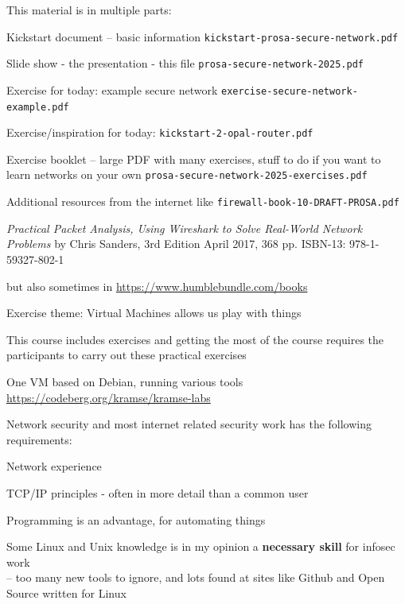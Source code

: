 \documentclass[Screen16to9,17pt]{foils}
\begin{document}
\begin{list2}
\item This material is in multiple parts:
\item Kickstart document -- basic information
\verb+kickstart-prosa-secure-network.pdf+
\item Slide show - the presentation - this file
\verb+prosa-secure-network-2025.pdf+
\item Exercise for today: example secure network \verb+exercise-secure-network-example.pdf+
\item Exercise/inspiration for today: \verb+kickstart-2-opal-router.pdf+
\item Exercise booklet -- large PDF with many exercises, stuff to do if you want to learn networks on your own
\verb+prosa-secure-network-2025-exercises.pdf+
\item Additional resources from the internet like \verb+firewall-book-10-DRAFT-PROSA.pdf+

\end{list2}



\emph{Practical Packet Analysis,
Using Wireshark to Solve Real-World Network Problems}
by Chris Sanders, 3rd Edition
April 2017, 368 pp.
ISBN-13:
978-1-59327-802-1

 but also sometimes in \url{https://www.humblebundle.com/books}



Exercise theme: Virtual Machines allows us play with things

\begin{list1}
\item This course includes exercises and getting the most of the course requires the participants to carry out these practical exercises
\item One VM based on Debian, running various tools\\
\url{https://codeberg.org/kramse/kramse-labs}
\item Network security and most internet related security work has the following requirements:
\begin{list2}
\item Network experience
\item TCP/IP principles - often in more detail than a common user
\item Programming is an advantage, for automating things
\item Some Linux and Unix knowledge is in my opinion a {\bf necessary skill} for infosec work\\
-- too many new tools to ignore, and lots found at sites like Github and Open Source written for Linux
\end{list2}
\end{list1}
\end{document}
